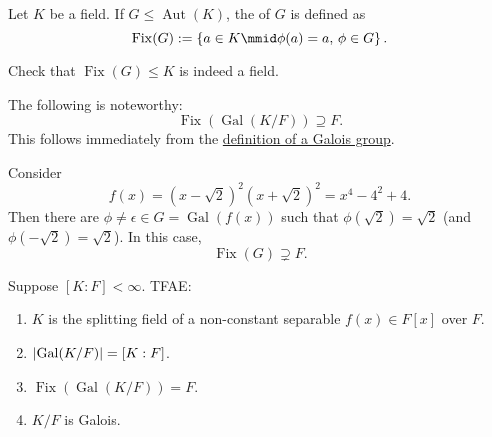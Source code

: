 \documentclass[notoc,notitlepage]{tufte-book}
\DeclareMathOperator{\Aut}{Aut}
\DeclareMathOperator{\Gal}{Gal}
\DeclareMathOperator{\Fix}{Fix}
\begin{document}
\begin{defn}\label{defn:fixed_field}
  Let $K$ be a field. If $G \leq \Aut(K)$, the  of $G$ is
  defined as
  \begin{equation*}
    \Fix(G) := \left\{ a \in K \mmid \phi(a) = a, \, \phi \in G \right\}.
  \end{equation*}
\end{defn}

\begin{ex}
  Check that $\Fix(G) \leq K$ is indeed a field.
\end{ex}

\begin{remark}
  The following is noteworthy:
  \begin{equation*}
    \Fix(\Gal(K / F)) \supseteq F.
  \end{equation*}
  This follows immediately from the \hyperref[defn:galois_group]{definition of a
  Galois group}.
\end{remark}

\begin{eg}
  Consider
  \begin{equation*}
    f(x) = (x - \sqrt{2})^2 (x + \sqrt{2})^2 = x^4 - 4^2 + 4.
  \end{equation*}
  Then there are $\phi \neq \epsilon \in G = \Gal(f(x))$ such that
  $\phi(\sqrt{2}) = \sqrt{2}$ (and $\phi(-\sqrt{2}) = \sqrt{2}$). In this case,
  \begin{equation*}
    \Fix(G) \supsetneq F.
  \end{equation*}
\end{eg}

\begin{thm}\label{thm:characterization_of_galois_extensions}
  Suppose $[ K : F ] < \infty$. TFAE:
  \begin{enumerate}
    \item $K$ is the splitting field of a non-constant separable $f(x) \in F[x]$
      over $F$.
    \item $\abs{\Gal(K / F)} = [ K : F ]$.
    \item $\Fix(\Gal(K / F)) = F$.
    \item $K / F$ is Galois.
  \end{enumerate}
\end{thm}
\end{document}
